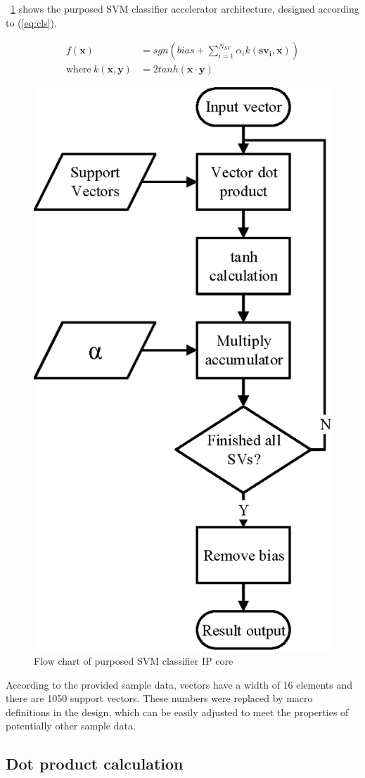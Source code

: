\documentclass[journal]{IEEEtran}
\newcommand{\fref}[1]{\figurename~\ref{#1}}
\newcommand{\eref}[1]{(\ref{#1})}
\begin{document}
\fref{fig:ip} shows the purposed SVM classifier accelerator architecture, designed according to \eref{eq:cls}.

\begin{align}
	f(\bm{x}) &= sgn \left( bias + \sum_{i=1}^{N_{SV}} \alpha_i k(\bm{{sv}_i}, \bm{x}) \right)
	\label{eq:cls}\\
	\text{where}~k(\bm{x}, \bm{y}) &= 2 tanh(\bm{x} \cdot \bm{y})
\end{align}

\begin{figure}[t]
	\centering
	\includegraphics[width=0.6\columnwidth]{IP}
	\caption{Flow chart of purposed SVM classifier IP core}
	\label{fig:ip}
\end{figure}

According to the provided sample data, vectors have a width of 16 elements and there are 1050 support vectors. These numbers were replaced by macro definitions in the design, which can be easily adjusted to meet the properties of potentially other sample data.

\subsection{Dot product calculation}
\end{document}
